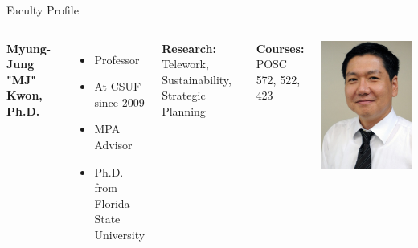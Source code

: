 \documentclass[10pt]{beamer}
\newlength{\imageheight}
\begin{document}
        \begin{frame}{Faculty Profile}
        \begin{columns}[t]
        \textbf{Myung-Jung "MJ" Kwon, Ph.D.}
        \begin{itemize}
        \item Professor
        \item At CSUF since 2009
        \item MPA Advisor
        \item Ph.D. from Florida State University
        \end{itemize}
        
        \textbf{Research:} Telework, Sustainability, Strategic Planning
        
        \textbf{Courses:} POSC 572, 522, 423
        
        \vspace*{0.5cm}
        \includegraphics[height=\imageheight]{images/kwon.jpg}
        \end{columns}
        \end{frame}
        
\end{document}
